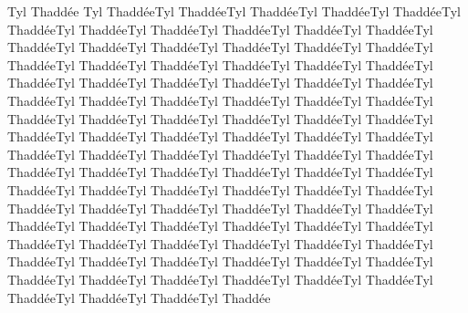 Tyl Thaddée Tyl ThaddéeTyl ThaddéeTyl ThaddéeTyl ThaddéeTyl ThaddéeTyl ThaddéeTyl ThaddéeTyl ThaddéeTyl ThaddéeTyl ThaddéeTyl ThaddéeTyl ThaddéeTyl ThaddéeTyl ThaddéeTyl ThaddéeTyl ThaddéeTyl ThaddéeTyl ThaddéeTyl ThaddéeTyl ThaddéeTyl ThaddéeTyl ThaddéeTyl ThaddéeTyl ThaddéeTyl ThaddéeTyl ThaddéeTyl ThaddéeTyl ThaddéeTyl ThaddéeTyl ThaddéeTyl ThaddéeTyl ThaddéeTyl ThaddéeTyl ThaddéeTyl ThaddéeTyl ThaddéeTyl ThaddéeTyl ThaddéeTyl ThaddéeTyl ThaddéeTyl ThaddéeTyl ThaddéeTyl ThaddéeTyl ThaddéeTyl ThaddéeTyl ThaddéeTyl ThaddéeTyl ThaddéeTyl ThaddéeTyl ThaddéeTyl ThaddéeTyl ThaddéeTyl ThaddéeTyl ThaddéeTyl ThaddéeTyl ThaddéeTyl ThaddéeTyl ThaddéeTyl ThaddéeTyl ThaddéeTyl ThaddéeTyl ThaddéeTyl ThaddéeTyl ThaddéeTyl ThaddéeTyl ThaddéeTyl ThaddéeTyl ThaddéeTyl ThaddéeTyl ThaddéeTyl ThaddéeTyl ThaddéeTyl ThaddéeTyl ThaddéeTyl ThaddéeTyl ThaddéeTyl ThaddéeTyl ThaddéeTyl ThaddéeTyl ThaddéeTyl ThaddéeTyl ThaddéeTyl ThaddéeTyl ThaddéeTyl ThaddéeTyl ThaddéeTyl ThaddéeTyl ThaddéeTyl ThaddéeTyl ThaddéeTyl ThaddéeTyl ThaddéeTyl ThaddéeTyl ThaddéeTyl ThaddéeTyl ThaddéeTyl ThaddéeTyl ThaddéeTyl Thaddée